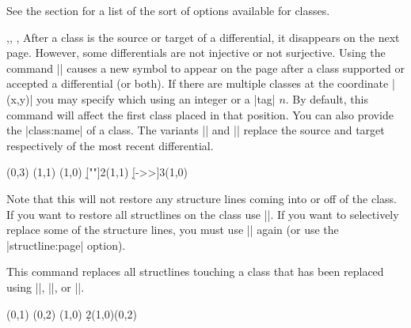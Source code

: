 \begin{sseqdata}[name = basic, cohomological Serre grading]
\begin{command}{\class\ooptions{}}
See the  section for a list of the
sort of options available for classes.
\end{command}

\begin{commandlist}{{\replaceclass\ooptions{}},\replaceclass\ooptions{},
\replacesource\ooptions, \replacetarget\ooptions}%
After a class is the source or target of a differential, it disappears on the
next page. However, some differentials are not injective or not surjective.
Using the command |\replaceclass| causes a new symbol to appear on the page
after a class supported or accepted a differential (or both). If there are
multiple classes at the coordinate |(x,y)| you may specify which using an
integer or a |tag| $n$. By default, this command will affect the first class
placed in that position. You can also provide the |class:name| of a class. The
variants |\replacesource| and |\replacetarget| replace the source and target
respectively of the most recent differential.
\begin{codeexample}[]
\begin{sseqdata}[name = replace class example, Adams grading, classes = {draw = none } ]
\class["\mathbb{Z}"](0,3)
\class["\mathbb{Z}"](1,1)
\class["\mathbb{Z}"](1,0)
\d[""]2(1,1)
\replacetarget["\mathbb{Z}/2"] %
\d[->>]3(1,0)
\replacesource["2\mathbb{Z}"]    %
\end{sseqdata}
\printpage[ name = replace class example, page = 2 ] \qquad
\printpage[ name = replace class example, page = 3 ] \qquad
\printpage[ name = replace class example, page = 4 ]
\end{codeexample}
Note that this will not restore any structure lines coming into or off of the
class. If you want to restore all structlines on the class use
|\replacestructlines|. If you want to selectively replace some of the structure
lines, you must use |\structline| again (or use the |structline:page| option).
\end{commandlist}

\begin{command}{\replacestructlines\opt{\pars{\sourcecoord}}}%
This command replaces all structlines touching a class that has been
replaced using |\replaceclass|, |\replacesource|, or |\replacetarget|.
\begin{codeexample}[]
\begin{sseqdata}[name=replacestructlines]
\class(0,1)
\class(0,2)
\structline
\class(1,0)
\d2(1,0)(0,2)
\replacetarget\replacestructlines
\end{sseqdata}
\printpage[name=replacestructlines, page=3]
\end{codeexample}
\end{command}


\end{sseqdata}
